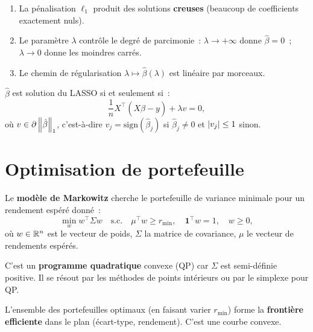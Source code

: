 \begin{proposition}
\begin{enumerate}
  \item La p\'enalisation $\ell_1$ produit des solutions \textbf{creuses}
        (beaucoup de coefficients exactement nuls).
  \item Le param\`etre $\lambda$ contr\^ole le degr\'e de parcimonie~:
        $\lambda \to +\infty$ donne $\hat{\beta} = 0$~;
        $\lambda \to 0$ donne les moindres carr\'es.
  \item Le chemin de r\'egularisation
        $\lambda \mapsto \hat{\beta}(\lambda)$ est lin\'eaire par morceaux.
\end{enumerate}
\end{proposition}

\begin{theoreme}
$\hat{\beta}$ est solution du LASSO si et seulement si~:
\[
  \frac{1}{n} X^\top (X\hat{\beta} - y) + \lambda v = 0,
\]
o\`u $v \in \partial \left\| \hat{\beta} \right\|_1$, c'est-\`a-dire
$v_j = \mathrm{sign}(\hat{\beta}_j)$ si $\hat{\beta}_j \ne 0$ et
$\left| v_j \right| \leq 1$ sinon.
\end{theoreme}

\section{Optimisation de portefeuille}

\begin{definition}
Le \textbf{mod\`ele de Markowitz} cherche le portefeuille de variance
minimale pour un rendement esp\'er\'e donn\'e~:
\[
  \min_w w^\top \Sigma w \quad \text{s.c.} \quad
  \mu^\top w \geq r_{\min}, \quad
  \mathbf{1}^\top w = 1, \quad w \geq 0,
\]
o\`u $w \in \mathbb{R}^n$ est le vecteur de poids, $\Sigma$ la matrice de
covariance, $\mu$ le vecteur de rendements esp\'er\'es.
\end{definition}

\begin{remarque}
C'est un \textbf{programme quadratique} convexe (QP) car $\Sigma$ est
semi-d\'efinie positive. Il se r\'esout par les m\'ethodes de points
int\'erieurs ou par le simplexe pour QP.
\end{remarque}

\begin{proposition}
L'ensemble des portefeuilles optimaux (en faisant varier $r_{\min}$) forme
la \textbf{fronti\`ere efficiente} dans le plan
(\'ecart-type, rendement). C'est une courbe convexe.
\end{proposition}

